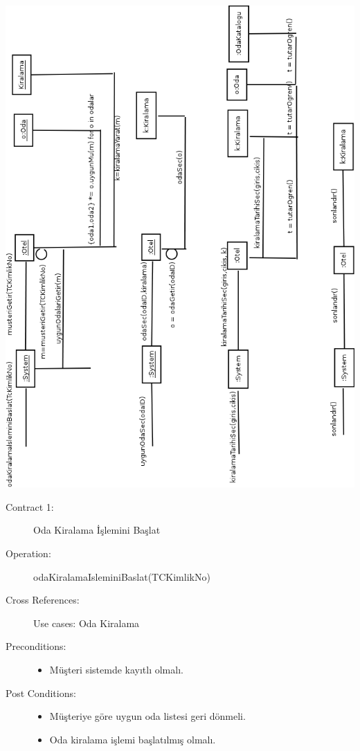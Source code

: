 \documentclass[12pt,a4paper]{report}
\begin{document}
\begin{center}
\includegraphics{dia/eventdiagram-usecase2.png}
\end{center}

\newpage

\begin{description}
\item[Contract 1:] Oda Kiralama İşlemini Başlat
\item[Operation:] odaKiralamaIsleminiBaslat(TCKimlikNo)
\item[Cross References:] Use cases: Oda Kiralama
\item[Preconditions:] \hspace{10 mm}
\begin{itemize}
\item Müşteri sistemde kayıtlı olmalı.
\end{itemize}
\item[Post Conditions:] \hspace{10 mm}
\begin{itemize} 
\item Müşteriye göre uygun oda listesi geri dönmeli.
\item Oda kiralama işlemi başlatılmış olmalı. \\
\end{itemize}
\end{description}
\end{document}

